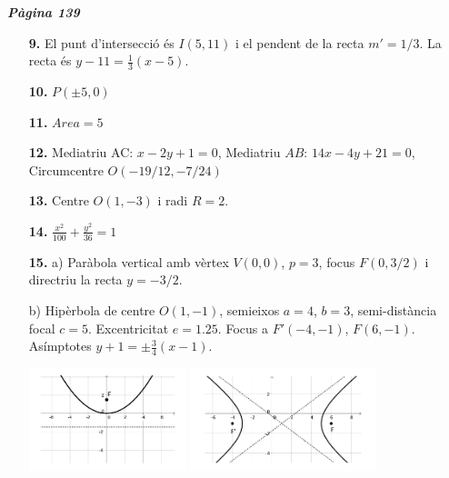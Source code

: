 \documentclass[a4paper, pdf, twoside]{book}
\begin{document}
\begin{multicols}{2}

{\textbf{\em Pàgina 139}} \hrulefill
\begin{enumerate}
\vspace{0.25cm}
\item[\fontfamily{phv}\selectfont\color{blue}\textbf{9. }]  \scalebox{0.6}{\simbolclau } 
El punt d'intersecció és $I(5,11)$ i el pendent de la recta $m'=1/3$. La recta és $y-11=\frac {1}{3}(x-5)$.
 \end{enumerate}
\begin{enumerate}
\vspace{0.25cm}
\item[\fontfamily{phv}\selectfont\color{blue}\textbf{10. }]  \scalebox{0.6}{\simbolclau } 
$P(\pm 5, 0)$
\vspace{0.25cm}
\item[\fontfamily{phv}\selectfont\color{blue}\textbf{11. }]  \scalebox{0.6}{\simbolclau } 
$Area=5$
\vspace{0.25cm}
\item[\fontfamily{phv}\selectfont\color{blue}\textbf{12. }]  \scalebox{0.6}{\simbolclau } 
Mediatriu AC: $x-2y+1=0$, Mediatriu $AB$: $14x-4y+21=0$, Circumcentre $O(-19/12, -7/24)$
\vspace{0.25cm}
\item[\fontfamily{phv}\selectfont\color{blue}\textbf{13. }]  \scalebox{0.6}{\simbolclau } 
Centre $O(1,-3)$ i radi $R=2$.
\vspace{0.25cm}
\item[\fontfamily{phv}\selectfont\color{blue}\textbf{14. }]  \scalebox{0.6}{\simbolclau } 
$\frac {x^2}{100}+\frac {y^2}{36}=1$
\vspace{0.25cm}
\item[\fontfamily{phv}\selectfont\color{blue}\textbf{15. }]  \scalebox{0.6}{\simbolclau } 
 a) Paràbola vertical amb vèrtex $V(0,0)$, $p=3$, focus $F(0,3/2)$ i directriu la recta $y=-3/2$. \par b) Hipèrbola de centre $O(1,-1)$, semieixos $a=4$, $b=3$, semi-distància focal $c=5$. Excentricitat $e=1.25$. Focus a $F'(-4,-1)$, $F(6,-1)$. Asímptotes $y+1=\pm \frac {3}{4}(x-1)$. \par \begin {center} \includegraphics [height=3cm]{img-10-bloc3/bloc3-sol-14a} \includegraphics [height=3cm]{img-10-bloc3/bloc3-sol-14b} \end {center} 

\end{enumerate}
\end{multicols}
\end{document}
